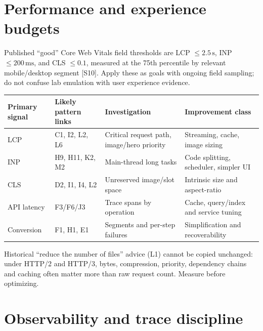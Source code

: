\documentclass[11pt]{article}
\begin{document}
\section{Performance and experience budgets}

\begin{modernbox}
Published ``good'' Core Web Vitals field thresholds are LCP $\leq 2.5\,\mathrm{s}$, INP $\leq 200\,\mathrm{ms}$, and CLS $\leq 0.1$, measured at the 75th percentile by relevant mobile/desktop segment [S10]. Apply these as goals with ongoing field sampling; do not confuse lab emulation with user experience evidence.
\end{modernbox}
\begin{tabularx}{\linewidth}{@{}>{\raggedright\arraybackslash}p{30mm}>{\raggedright\arraybackslash}p{40mm}>{\raggedright\arraybackslash}XX@{}}\toprule
Primary signal & Likely pattern links & Investigation & Improvement class\\\midrule
LCP & C1, I2, L2, L6 & Critical request path, image/hero priority & Streaming, cache, image sizing\\
INP & H9, H11, K2, M2 & Main-thread long tasks & Code splitting, scheduler, simpler UI\\
CLS & D2, I1, I4, L2 & Unreserved image/slot space & Intrinsic size and aspect-ratio\\
API latency & F3/F6/J3 & Trace spans by operation & Cache, query/index and service tuning\\
Conversion & F1, H1, E1 & Segments and per-step failures & Simplification and recoverability\\
\bottomrule\end{tabularx}
\begin{decisionbox}Historical ``reduce the number of files'' advice (L1) cannot be copied unchanged: under HTTP/2 and HTTP/3, bytes, compression, priority, dependency chains and caching often matter more than raw request count. Measure before optimizing.
\end{decisionbox}

\section{Observability and trace discipline}
\end{document}
